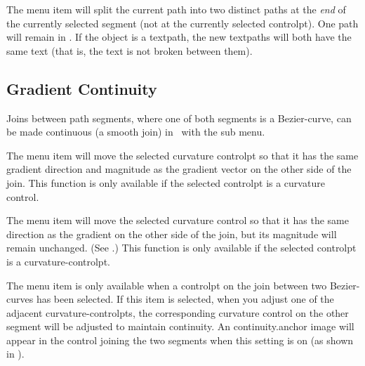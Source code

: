 
The  menu item will split the current path
into two distinct \glspl{path} at the \emph{end} of the currently
selected segment (not at the currently selected \gls*{controlpt}).
One path will remain in \editpathmode. 
If the object is a \gls*{textpath}, the new \glspl*{textpath} will
both have the same text (that is, the text is not broken between
them).


\subsection{Gradient Continuity}\label{sec:continous}

Joins between \gls{path} segments, where one of both segments is a
\gls{Bezier-curve}, can be made continuous (a smooth join)
in \editpathmode\ with the  sub menu.


The  menu item will move the selected
curvature \gls*{controlpt} so that it has the same gradient
direction and magnitude as the gradient vector on the other side of
the join.
This function is only available if the selected \gls{controlpt} is
a curvature control.


The  menu item will move the
selected curvature control so that it has the same direction as the
gradient on the other side of the join, but its magnitude will
remain unchanged. (See .)
This function is only available if the selected \gls{controlpt} is
a \gls{curvature-controlpt}.


The  menu item is only available
when a \gls*{controlpt} on the join between two \glspl{Bezier-curve}
has been selected. If this item is selected, when you adjust one of
the adjacent \glspl{curvature-controlpt}, the corresponding curvature
control on the other segment will be adjusted to maintain
\gls{continuity}. An \gls{continuity.anchor} image will appear in the control joining the
two segments when this setting is on (as shown in
).

